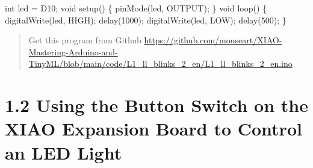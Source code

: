 \documentclass[
  letterpaper,
  DIV=11,
  numbers=noendperiod]{scrreprt}
\newenvironment{Shaded}{\begin{snugshade}}{\end{snugshade}}
\newcommand{\DataTypeTok}[1]{\textcolor[rgb]{0.68,0.00,0.00}{#1}}
\newcommand{\DecValTok}[1]{\textcolor[rgb]{0.68,0.00,0.00}{#1}}
\newcommand{\NormalTok}[1]{\textcolor[rgb]{0.00,0.23,0.31}{#1}}
\newcommand{\OperatorTok}[1]{\textcolor[rgb]{0.37,0.37,0.37}{#1}}
\begin{document}
\begin{Shaded}
\begin{Highlighting}[]
\DataTypeTok{int}\NormalTok{ led }\OperatorTok{=}\NormalTok{ D10}\OperatorTok{;}
\DataTypeTok{void}\NormalTok{ setup}\OperatorTok{()} \OperatorTok{\{}
\NormalTok{    pinMode}\OperatorTok{(}\NormalTok{led}\OperatorTok{,}\NormalTok{ OUTPUT}\OperatorTok{);}
\OperatorTok{\}}
\DataTypeTok{void}\NormalTok{ loop}\OperatorTok{()} \OperatorTok{\{}
\NormalTok{    digitalWrite}\OperatorTok{(}\NormalTok{led}\OperatorTok{,}\NormalTok{ HIGH}\OperatorTok{);}   
\NormalTok{    delay}\OperatorTok{(}\DecValTok{1000}\OperatorTok{);}                     
\NormalTok{    digitalWrite}\OperatorTok{(}\NormalTok{led}\OperatorTok{,}\NormalTok{ LOW}\OperatorTok{);}   
\NormalTok{    delay}\OperatorTok{(}\DecValTok{500}\OperatorTok{);}
\OperatorTok{\}}
\end{Highlighting}
\end{Shaded}

\begin{quote}
Get this program from Github
\url{https://github.com/mouseart/XIAO-Mastering-Arduino-and-TinyML/blob/main/code/L1_ll_blinks_2_en/L1_ll_blinks_2_en.ino}
\end{quote}


\hypertarget{using-the-button-switch-on-the-xiao-expansion-board-to-control-an-led-light}{%
\chapter*{1.2 Using the Button Switch on the XIAO Expansion Board to
Control an LED
Light}\label{using-the-button-switch-on-the-xiao-expansion-board-to-control-an-led-light}}

\end{document}
